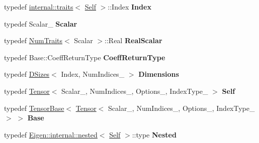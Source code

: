 \begin{DoxyCompactItemize}
\item 
\mbox{\label{class_eigen_1_1_tensor_acce4583bb4ed73c3dd16306c3d96b7f1}} 
typedef \hyperlink{struct_eigen_1_1internal_1_1traits}{internal\+::traits}$<$ \hyperlink{class_eigen_1_1_tensor}{Self} $>$\+::Index {\bfseries Index}
\item 
\mbox{\label{class_eigen_1_1_tensor_ac318cebe653a78f051dca2ea59af9a9f}} 
typedef Scalar\+\_\+ {\bfseries Scalar}
\item 
\mbox{\label{class_eigen_1_1_tensor_abfd26ffd07a60f37e19bca45cdeda709}} 
typedef \hyperlink{group___core___module_struct_eigen_1_1_num_traits}{Num\+Traits}$<$ Scalar $>$\+::Real {\bfseries Real\+Scalar}
\item 
\mbox{\label{class_eigen_1_1_tensor_a81776baaeaadf348a2a7bdb3e76a3d2d}} 
typedef Base\+::\+Coeff\+Return\+Type {\bfseries Coeff\+Return\+Type}
\item 
\mbox{\label{class_eigen_1_1_tensor_a33bb49acaa60106e409577aa9129c978}} 
typedef \hyperlink{struct_eigen_1_1_d_sizes}{D\+Sizes}$<$ Index, Num\+Indices\+\_\+ $>$ {\bfseries Dimensions}
\item 
\mbox{\label{class_eigen_1_1_tensor_ab33b8fd823b0258d167625f35db35eb4}} 
typedef \hyperlink{class_eigen_1_1_tensor}{Tensor}$<$ Scalar\+\_\+, Num\+Indices\+\_\+, Options\+\_\+, Index\+Type\+\_\+ $>$ {\bfseries Self}
\item 
\mbox{\label{class_eigen_1_1_tensor_aadebf932105d728ed8c3961f87799d38}} 
typedef \hyperlink{class_eigen_1_1_tensor_base}{Tensor\+Base}$<$ \hyperlink{class_eigen_1_1_tensor}{Tensor}$<$ Scalar\+\_\+, Num\+Indices\+\_\+, Options\+\_\+, Index\+Type\+\_\+ $>$ $>$ {\bfseries Base}
\item 
\mbox{\label{class_eigen_1_1_tensor_ad49db39b1b2028c0af0bf15d930b6ad9}} 
typedef \hyperlink{struct_eigen_1_1internal_1_1nested}{Eigen\+::internal\+::nested}$<$ \hyperlink{class_eigen_1_1_tensor}{Self} $>$\+::type {\bfseries Nested}
\item 
\mbox{\label{class_eigen_1_1_tensor_af2c9f01cb7423c11e0771d84d099d127}} 

\end{DoxyCompactItemize}
